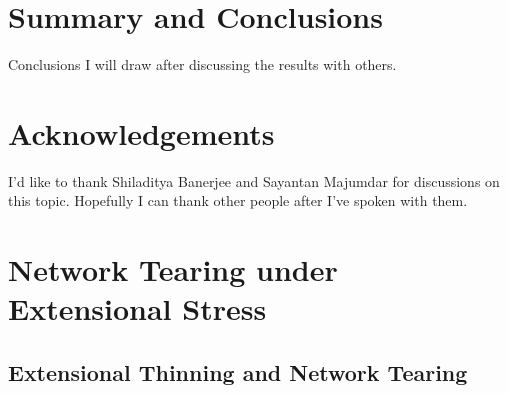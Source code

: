 \documentclass[pre,preprint]{revtex4-1}
\begin{document}

\section{Summary and Conclusions}
Conclusions I will draw after discussing the results with others.





















\section{Acknowledgements}
I'd like to thank Shiladitya Banerjee and Sayantan Majumdar for discussions on this topic.  Hopefully I can thank other people after I've spoken with them.

















\appendix
\addappheadtotoc




\section{Network Tearing under Extensional Stress}


\subsection{Extensional Thinning and Network Tearing}
\end{document}
